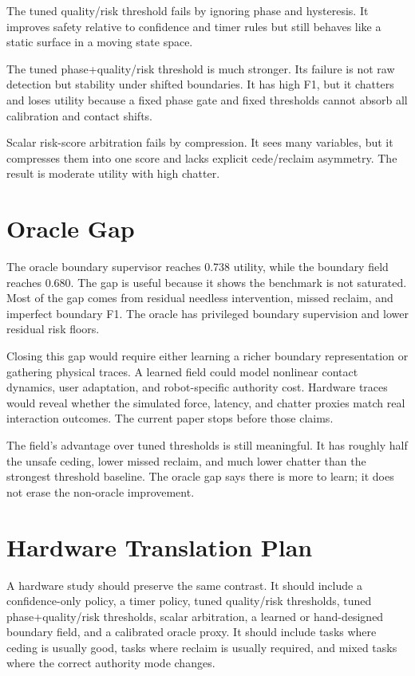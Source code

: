 \documentclass{article}
\begin{document}
The tuned quality/risk threshold fails by ignoring phase and hysteresis. It improves safety relative to confidence and timer rules but still behaves like a static surface in a moving state space.

The tuned phase+quality/risk threshold is much stronger. Its failure is not raw detection but stability under shifted boundaries. It has high F1, but it chatters and loses utility because a fixed phase gate and fixed thresholds cannot absorb all calibration and contact shifts.

Scalar risk-score arbitration fails by compression. It sees many variables, but it compresses them into one score and lacks explicit cede/reclaim asymmetry. The result is moderate utility with high chatter.

\clearpage
\section{Oracle Gap}

The oracle boundary supervisor reaches 0.738 utility, while the boundary field reaches 0.680. The gap is useful because it shows the benchmark is not saturated. Most of the gap comes from residual needless intervention, missed reclaim, and imperfect boundary F1. The oracle has privileged boundary supervision and lower residual risk floors.

Closing this gap would require either learning a richer boundary representation or gathering physical traces. A learned field could model nonlinear contact dynamics, user adaptation, and robot-specific authority cost. Hardware traces would reveal whether the simulated force, latency, and chatter proxies match real interaction outcomes. The current paper stops before those claims.

The field's advantage over tuned thresholds is still meaningful. It has roughly half the unsafe ceding, lower missed reclaim, and much lower chatter than the strongest threshold baseline. The oracle gap says there is more to learn; it does not erase the non-oracle improvement.

\clearpage
\section{Hardware Translation Plan}

A hardware study should preserve the same contrast. It should include a confidence-only policy, a timer policy, tuned quality/risk thresholds, tuned phase+quality/risk thresholds, scalar arbitration, a learned or hand-designed boundary field, and a calibrated oracle proxy. It should include tasks where ceding is usually good, tasks where reclaim is usually required, and mixed tasks where the correct authority mode changes.
\end{document}
